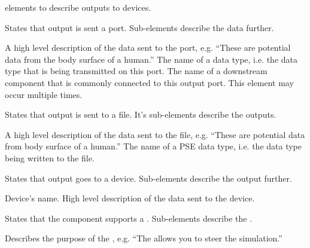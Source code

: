 \documentclass[11pt]{article}
\begin{document}
\begin{description}
\begin{description}
\begin{description}
       elements to describe outputs to devices.
      \begin{description}
         States that output is sent a port. Sub-elements describe the data further.
        \begin{description}
           A high level description of the data
          sent to the port, e.g. ``These are potential data from the body
          surface of a human.''
           The name of a \sr{} data type, i.e. the 
          data type that is being transmitted on this port.
           The name of a downstream component
          that is commonly connected to this output port.  This
          element may occur multiple times. 
        \end{description}
          States that output is sent to a file.  It's 
        sub-elements describe the outputs.
        \begin{description}
           A high level description of the data 
          sent to the file, e.g. ``These are potential data from body 
          surface of a human.''
            The name of a PSE data type, i.e. the 
          data type being written to the file.
        \end{description}
         States that output goes to a device.
        Sub-elements describe the output further.
        \begin{description}
           Device's name.
           High level description of the data
          sent to the device.
        \end{description}
      \end{description}
    \end{description}
     States that the component supports a \gui.
    Sub-elements describe the \gui.
    \begin{description}
       Describes the purpose of the \gui, e.g.
      ``The \gui{} allows you to steer the simulation.''

\end{description}
\end{description}
\end{description}
\end{document}
